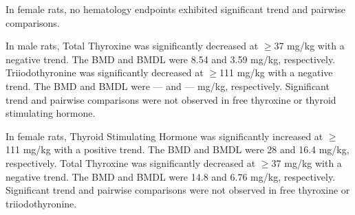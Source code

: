 In female rats, no hematology endpoints exhibited significant trend and pairwise comparisons.

In male rats, Total Thyroxine was significantly decreased at \ensuremath{\ge}37 mg/kg with a negative trend. The BMD and BMDL were 8.54 and 3.59 mg/kg, respectively. Triiodothyronine was significantly decreased at \ensuremath{\ge}111 mg/kg with a negative trend. The BMD and BMDL were — and — mg/kg, respectively. Significant trend and pairwise comparisons were not observed in free thyroxine or thyroid stimulating hormone.

In female rats, Thyroid Stimulating Hormone was significantly increased at \ensuremath{\ge}111 mg/kg with a positive trend. The BMD and BMDL were 28 and 16.4 mg/kg, respectively. Total Thyroxine was significantly decreased at \ensuremath{\ge}37 mg/kg with a negative trend. The BMD and BMDL were 14.8 and 6.76 mg/kg, respectively. Significant trend and pairwise comparisons were not observed in free thyroxine or triiodothyronine.

